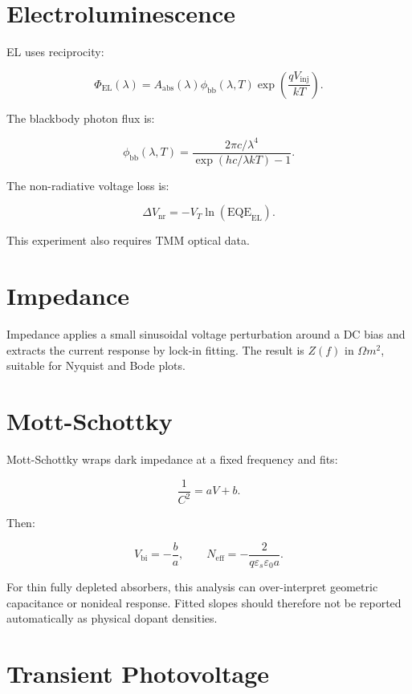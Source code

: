 \documentclass[
  11pt,
  american,
]{report}
\begin{document}
\hypertarget{electroluminescence}{%
\section{Electroluminescence}\label{electroluminescence}}

EL uses reciprocity:

\[
\Phi_\mathrm{EL}(\lambda)
=
A_\mathrm{abs}(\lambda)
\phi_\mathrm{bb}(\lambda,T)
\exp\left(\frac{qV_\mathrm{inj}}{kT}\right).
\]

The blackbody photon flux is:

\[
\phi_\mathrm{bb}(\lambda,T)
=
\frac{2\pi c/\lambda^4}
{\exp(hc/\lambda kT)-1}.
\]

The non-radiative voltage loss is:

\[
\Delta V_\mathrm{nr}
=
-V_T\ln(\mathrm{EQE}_\mathrm{EL}).
\]

This experiment also requires TMM optical data.

\hypertarget{impedance}{%
\section{Impedance}\label{impedance}}

Impedance applies a small sinusoidal voltage perturbation around a DC
bias and extracts the current response by lock-in fitting. The result is
\(Z(f)\) in \(\Omega m^2\), suitable for Nyquist and Bode plots.

\hypertarget{mott-schottky}{%
\section{Mott-Schottky}\label{mott-schottky}}

Mott-Schottky wraps dark impedance at a fixed frequency and fits:

\[
\frac{1}{C^2}=aV+b.
\]

Then:

\[
V_\mathrm{bi}=-\frac{b}{a},
\qquad
N_\mathrm{eff}
=
-\frac{2}{q\varepsilon_s\varepsilon_0 a}.
\]

For thin fully depleted absorbers, this analysis can over-interpret
geometric capacitance or nonideal response. Fitted slopes should
therefore not be reported automatically as physical dopant densities.

\hypertarget{transient-photovoltage}{%
\section{Transient Photovoltage}\label{transient-photovoltage}}
\end{document}
